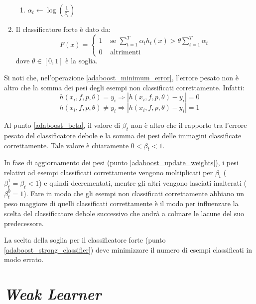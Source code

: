 \begin{enumerate}
\begin{enumerate}
                    \item $\alpha_t \leftarrow \log(\frac{1}{\beta_t})$
                \end{enumerate}

                \item \label{adaboost_strong_classifier} Il classificatore forte è dato da:
                \begin{equation}
                    F(x) = \begin{cases}
                    1 & \text{ se } \sum_{t = 1}^{T} \alpha_t h_t(x) > \theta \sum_{t = 1}^{T} \alpha_t \\
                    0 & \text{ altrimenti }
                \end{cases}
            \end{equation}
            dove $\theta \in [0,1]$ è la soglia.
            \end{enumerate}

            Si noti che, nel'operazione \ref{adaboost_minimum_error}, l'errore pesato non è altro che la somma dei pesi degli esempi non classificati correttamente. Infatti:
            $$ h(x_i, f, p, \theta) = y_i \Rightarrow |h(x_i, f, p, \theta) - y_i| = 0 $$
            $$ h(x_i, f, p, \theta) \neq y_i \Rightarrow |h(x_i, f, p, \theta) - y_i| = 1 $$

            Al punto \ref{adaboost_beta}, il valore di $\beta_t$ non è altro che il rapporto tra l'errore pesato del classificatore debole e la somma dei pesi delle immagini classificate correttamente. Tale valore è chiaramente $0 < \beta_t < 1$.

            In fase di aggiornamento dei pesi (punto \ref{adaboost_update_weights}), i pesi relativi ad esempi classificati correttamente vengono moltiplicati per $\beta_t$ ($\beta_{t}^{1} = \beta_t < 1$) e quindi decrementati, mentre gli altri vengono lasciati inalterati ($\beta_{t}^{0} = 1$). Fare in modo che gli esempi non classificati correttamente abbiano un peso maggiore di quelli classificati correttamente è il modo per influenzare la scelta del classificatore debole successivo che andrà a colmare le lacune del suo predecessore.

            La scelta della soglia per il classificatore forte (punto \ref{adaboost_strong_classifier}) deve minimizzare il numero di esempi classificati in modo errato.
    \section{\emph{Weak Learner}}
    \label{sec:weak_learner}
